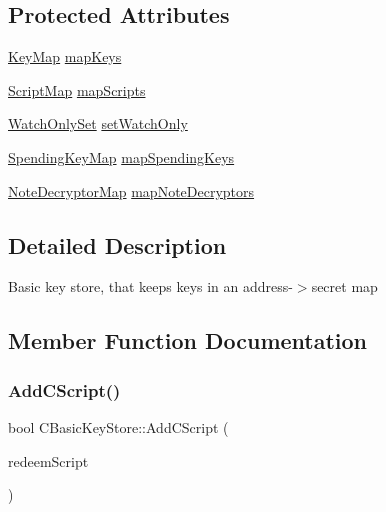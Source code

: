 \subsection*{Protected Attributes}
\begin{DoxyCompactItemize}
\item 
\mbox{\hyperlink{keystore_8h_a4dc9f57afc8615aef701e40cf20d024f}{Key\+Map}} \mbox{\hyperlink{class_c_basic_key_store_ac520003e5c3d863bf71fde247c6e0672}{map\+Keys}}
\item 
\mbox{\hyperlink{keystore_8h_afb22a3e7e10e8048d2fb3fb72fe38345}{Script\+Map}} \mbox{\hyperlink{class_c_basic_key_store_a8e9fa81382129c1535a0ee7b0d9c8f3b}{map\+Scripts}}
\item 
\mbox{\hyperlink{keystore_8h_a501c3a7b9932bbc7168dc7b3fc5d149e}{Watch\+Only\+Set}} \mbox{\hyperlink{class_c_basic_key_store_ac3391cb491e315403ad9af6afd1313da}{set\+Watch\+Only}}
\item 
\mbox{\hyperlink{keystore_8h_a15f25b2302a5fa99fc89afa51401bf12}{Spending\+Key\+Map}} \mbox{\hyperlink{class_c_basic_key_store_a96ef08a1453e56a9a147d9b3add03813}{map\+Spending\+Keys}}
\item 
\mbox{\hyperlink{keystore_8h_abe42b6c1b0529af8aa631494acef112a}{Note\+Decryptor\+Map}} \mbox{\hyperlink{class_c_basic_key_store_a4f2a294a146a9bb2d20cc3bca094d9eb}{map\+Note\+Decryptors}}
\end{DoxyCompactItemize}


\subsection{Detailed Description}
Basic key store, that keeps keys in an address-\/$>$secret map 

\subsection{Member Function Documentation}
\mbox{\label{class_c_basic_key_store_a56249ce3540398999cd397eeb662e836}} 
\subsubsection{\texorpdfstring{Add\+C\+Script()}{AddCScript()}}
{\footnotesize\ttfamily bool C\+Basic\+Key\+Store\+::\+Add\+C\+Script (\begin{DoxyParamCaption}\item[{const C\+Script \&}]{redeem\+Script }\end{DoxyParamCaption})\hspace{0.3cm}{\ttfamily [virtual]}}



